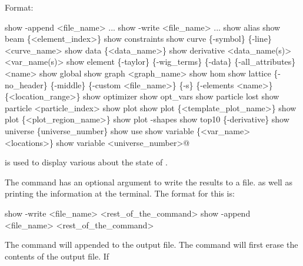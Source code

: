 {{{Format:
\begin{example}
  show -append <file_name> ...
  show -write <file_name> ...
  show alias
  show beam \{<element_index>\}
  show constraints
  show curve \{-symbol\} \{-line\} <curve_name> 
  show data \{<data_name>\} 
  show derivative <data_name(s)> <var_name(s)>
  show element \{-taylor\} \{-wig_terms\} \{-data\} \{-all_attributes\} <name>
  show global
  show graph <graph_name>
  show hom
  show lattice \{-no_header\} \{-middle\} \{-custom <file_name>\} 
                            \{-s\} \{-elements <name>\} \{<location_range>\}
  show optimizer
  show opt_vars
  show particle lost
  show particle <particle_index>
  show plot
  show plot \{<template_plot_name>\}
  show plot \{<plot_region_name>\}
  show plot -shapes
  show top10 \{-derivative\}
  show universe \{universe_number\}
  show use
  show variable \{<var_name> <locations>\}
  show variable <universe_number>@
\end{example}

\vskip 0.2in 
 is used to display various about the state of \tao. 

The  command has an optional argument to write the results to a file.
as well as printing the information at the terminal. The format for this is:
\begin{example}
  show -write <file_name> <rest_of_the_command>
  show -append <file_name> <rest_of_the_command>
\end{example}
The  command will appended to the output file. The
 command will first erase the contents of the output
file. If \vn{global%
digit number is substituted for the \vn{*}. The value of the number
starts at \vn{001} and increases by 1 each time \vn{show -write} is
used.
Example:
\begin{example}
  show -write orb.dat orbit    ! Write orbit data to the file "orb.dat".
\end{example}



\begin{description}

  \item[show alias] \Newline
Shows a list of defined aliases. See the \vn{alias} command for more
details.


\end{description}}}}}
